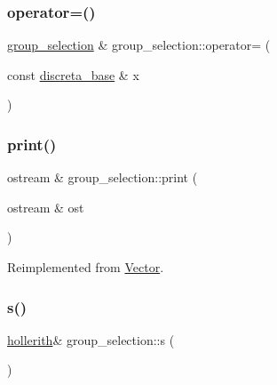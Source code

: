 \mbox{\label{classgroup__selection_abf861ab6bf4c061dd36775301c1e4f46}} 
\subsubsection{\texorpdfstring{operator=()}{operator=()}}
{\footnotesize\ttfamily \mbox{\hyperlink{classgroup__selection}{group\+\_\+selection}} \& group\+\_\+selection\+::operator= (\begin{DoxyParamCaption}\item[{const \mbox{\hyperlink{classdiscreta__base}{discreta\+\_\+base}} \&}]{x }\end{DoxyParamCaption})}

\mbox{\label{classgroup__selection_a522bc3a2346d1031fbb82f5a4d0b29cc}} 
\subsubsection{\texorpdfstring{print()}{print()}}
{\footnotesize\ttfamily ostream \& group\+\_\+selection\+::print (\begin{DoxyParamCaption}\item[{ostream \&}]{ost }\end{DoxyParamCaption})\hspace{0.3cm}{\ttfamily [virtual]}}



Reimplemented from \mbox{\hyperlink{class_vector_a71d7e24bcfdfc69d4a2137360acb066c}{Vector}}.

\mbox{\label{classgroup__selection_a686cb0c6a3a040796b112b8007ea8223}} 
\subsubsection{\texorpdfstring{s()}{s()}}
{\footnotesize\ttfamily \mbox{\hyperlink{classhollerith}{hollerith}}\& group\+\_\+selection\+::s (\begin{DoxyParamCaption}{ }\end{DoxyParamCaption})\hspace{0.3cm}{\ttfamily [inline]}}

